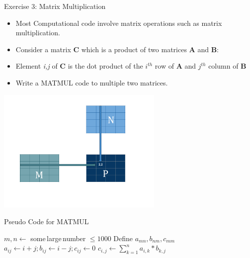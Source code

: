 \documentclass[10pt,t]{beamer}
\begin{document}
\begin{frame}[allowframebreaks]{Exercise 3: Matrix Multiplication}
  \begin{itemize}
    \item Most Computational code involve matrix operations such as matrix multiplication.
    \item Consider a matrix {\bf C} which is a product of two matrices {\bf A} and {\bf B}:
    \item[] Element {\it i,j} of {\bf C} is the dot product of the $i^{th}$ row of {\bf A} and $j^{th}$ column of {\bf B}
    \item Write a MATMUL code to multiple two matrices.
  \end{itemize}
  \begin{center}
    \includegraphics[width=0.6\textwidth]{./matmul}
  \end{center}

  \begin{algorithm}[H]
    \caption{Pseudo Code for MATMUL}
    \begin{algorithmic}
      \State $m,n \gets$ some\,large\,number $\le 1000$
      \State Define $a_{mn}, b_{nm}, c_{mm}$
      \State $a_{ij} \gets i+j; b_{ij} \gets i-j; c_{ij} \gets 0$
      \State $c_{i,j} \gets \sum^{n}_{k=1} a_{i,k}*b_{k,j}$
      \EndDo
      \EndDo
    \end{algorithmic}
  \end{algorithm}
\end{frame}
\end{document}
